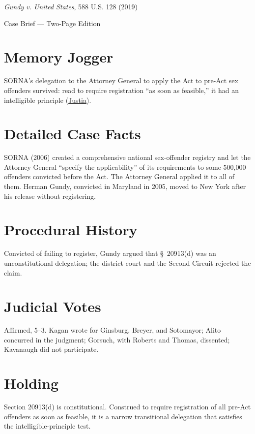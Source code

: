 \documentclass[12pt]{article}
\begin{document}
\begin{center}
{\LARGE \textit{Gundy v. United States}, 588 U.S. 128 (2019)\par}
\vspace{0.5em}
{\large Case Brief --- Two-Page Edition\par}
\end{center}

\section{Memory Jogger}
SORNA's delegation to the Attorney General to apply the Act to pre-Act sex offenders survived: read to require registration ``as soon as feasible,'' it had an intelligible principle (\href{https://supreme.justia.com/cases/federal/us/588/17-6086/}{Justia}).

\section{Detailed Case Facts}
SORNA (2006) created a comprehensive national sex-offender registry and let the Attorney General ``specify the applicability'' of its requirements to some 500,000 offenders convicted before the Act. The Attorney General applied it to all of them. Herman Gundy, convicted in Maryland in 2005, moved to New York after his release without registering.

\section{Procedural History}
Convicted of failing to register, Gundy argued that \S~20913(d) was an unconstitutional delegation; the district court and the Second Circuit rejected the claim.

\section{Judicial Votes}
Affirmed, 5--3. Kagan wrote for Ginsburg, Breyer, and Sotomayor; Alito concurred in the judgment; Gorsuch, with Roberts and Thomas, dissented; Kavanaugh did not participate.

\section{Holding}
Section 20913(d) is constitutional. Construed to require registration of all pre-Act offenders as soon as feasible, it is a narrow transitional delegation that satisfies the intelligible-principle test.
\end{document}
